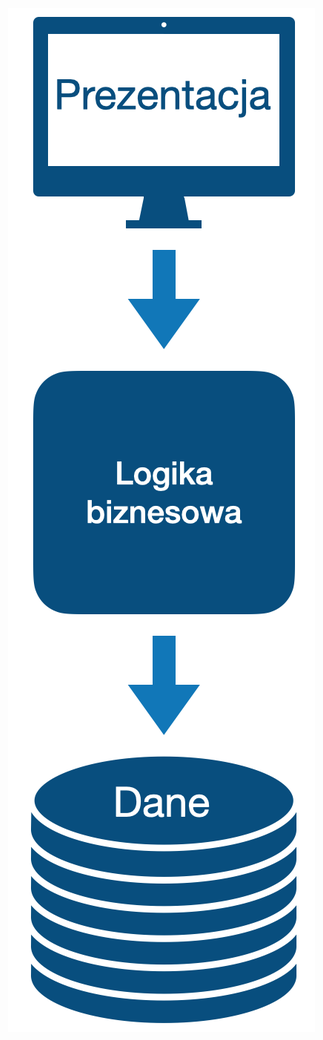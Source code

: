 \documentclass[12pt]{article}
\begin{document}
            \begin{center}
                \includegraphics[scale=0.30]{patterns/three-layer.png}
            \end{center}
\end{document}
